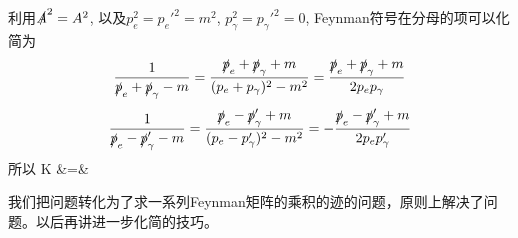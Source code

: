 \documentclass[CJK]{beamer}
\begin{document}
\begin{frame}
\bch
{\small
利用$\slashed{A}^2 = A^2$, 以及$p_e^2 = p_e'^2 = m^2$, $p_\gamma^2 = p_\gamma'^2 = 0$, Feynman符号在分母的项可以化简为
$$\frac{1}{\slashed{p}_e+\slashed{p}_\gamma-m} = \frac{\slashed{p}_e+\slashed{p}_\gamma+m}{(p_e+p_\gamma)^2-m^2} =  \frac{\slashed{p}_e+\slashed{p}_\gamma+m}{2p_ep_\gamma} $$
$$\frac{1}{\slashed{p}_e-\slashed{p}_\gamma'-m} = \frac{\slashed{p}_e-\slashed{p}_\gamma'+m}{(p_e-p_\gamma')^2-m^2} = - \frac{\slashed{p}_e-\slashed{p}_\gamma'+m}{2p_ep_\gamma'} $$
所以
{\scriptsize
\bea
K &=&  
\eea
}
}
\ech
\end{frame}

\begin{frame}
\bch
我们把问题转化为了求一系列Feynman矩阵的乘积的迹的问题，原则上解决了问题。以后再讲进一步化简的技巧。
\ech
\end{frame}
\end{document}
